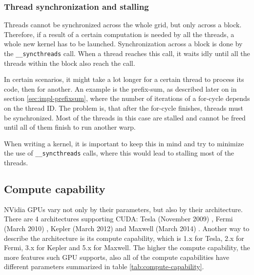 \subsubsection{Thread synchronization and stalling}\label{subsubsec:cuda-thread-sync-stall}

Threads cannot be synchronized across the whole grid, but only across a block. Therefore, if a result of a certain computation is needed by all the threads, a whole new kernel has to be launched. Synchronization across a block is done by the \verb|__syncthreads| call. When a thread reaches this call, it waits idly until all the threads within the block also reach the call.

In certain scenarios, it might take a lot longer for a certain thread to process its code, then for another. An example is the prefix-sum, as described later on in section \ref{sec:impl-prefixsum}, where the number of iterations of a for-cycle depends on the thread ID. The problem is, that after the for-cycle finishes, threads must be synchronized. Most of the threads in this case are stalled and cannot be freed until all of them finish to run another warp.

When writing a kernel, it is important to keep this in mind and try to minimize the use of \verb|__syncthreads| calls, where this would lead to stalling most of the threads.

\subsection{Compute capability}\label{subsec:cuda-compute-capability}

NVidia GPUs vary not only by their parameters, but also by their architecture. There are 4 architectures supporting CUDA: Tesla (November 2009) \cite{lindholm2008nvidia}, Fermi (March 2010) \cite{fermi-whitepaper}, Kepler (March 2012) \cite{kepler-whitepaper} and Maxwell (March 2014) \cite{maxwell-whitepaper}. Another way to describe the architecture is its compute capability, which is 1.x for Tesla, 2.x for Fermi, 3.x for Kepler and 5.x for Maxwell. The higher the compute capability, the more features such GPU supports, also all of the compute capabilities have different parameters summarized in table \ref{tab:compute-capability}.

